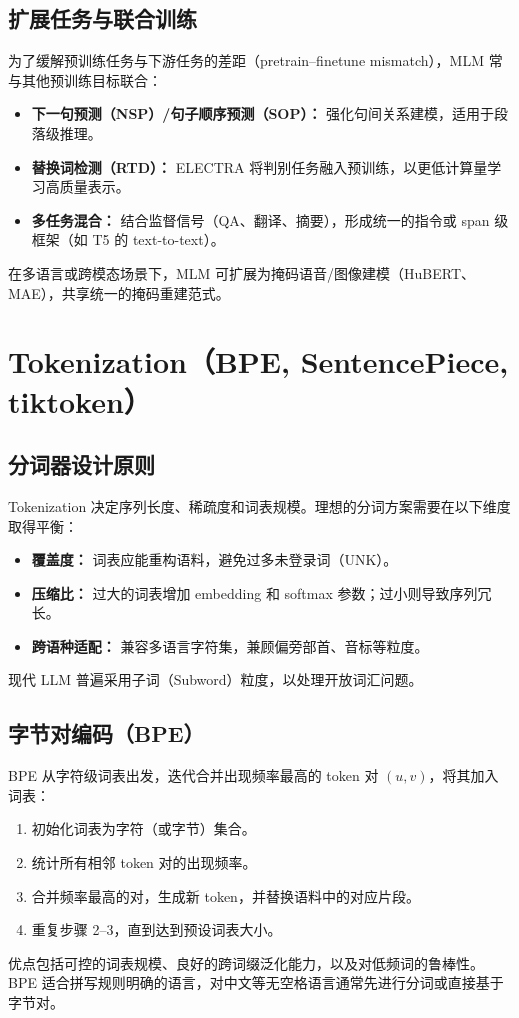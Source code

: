 \documentclass[UTF8,zihao=-4]{ctexart}
\begin{document}
\subsection{扩展任务与联合训练}
为了缓解预训练任务与下游任务的差距（pretrain–finetune mismatch），MLM 常与其他预训练目标联合：
\begin{itemize}
  \item \textbf{下一句预测（NSP）/句子顺序预测（SOP）：} 强化句间关系建模，适用于段落级推理。
  \item \textbf{替换词检测（RTD）：} ELECTRA 将判别任务融入预训练，以更低计算量学习高质量表示。
  \item \textbf{多任务混合：} 结合监督信号（QA、翻译、摘要），形成统一的指令或 span 级框架（如 T5 的 text-to-text）。
\end{itemize}
在多语言或跨模态场景下，MLM 可扩展为掩码语音/图像建模（HuBERT、MAE），共享统一的掩码重建范式。

\section{Tokenization（BPE, SentencePiece, tiktoken）}
\subsection{分词器设计原则}
Tokenization 决定序列长度、稀疏度和词表规模。理想的分词方案需要在以下维度取得平衡：
\begin{itemize}
  \item \textbf{覆盖度：} 词表应能重构语料，避免过多未登录词（UNK）。
  \item \textbf{压缩比：} 过大的词表增加 embedding 和 softmax 参数；过小则导致序列冗长。
  \item \textbf{跨语种适配：} 兼容多语言字符集，兼顾偏旁部首、音标等粒度。
\end{itemize}
现代 LLM 普遍采用子词（Subword）粒度，以处理开放词汇问题。

\subsection{字节对编码（BPE）}
BPE 从字符级词表出发，迭代合并出现频率最高的 token 对 $(u, v)$，将其加入词表：
\begin{enumerate}
  \item 初始化词表为字符（或字节）集合。
  \item 统计所有相邻 token 对的出现频率。
  \item 合并频率最高的对，生成新 token，并替换语料中的对应片段。
  \item 重复步骤 2--3，直到达到预设词表大小。
\end{enumerate}
优点包括可控的词表规模、良好的跨词缀泛化能力，以及对低频词的鲁棒性。BPE 适合拼写规则明确的语言，对中文等无空格语言通常先进行分词或直接基于字节对。
\end{document}
